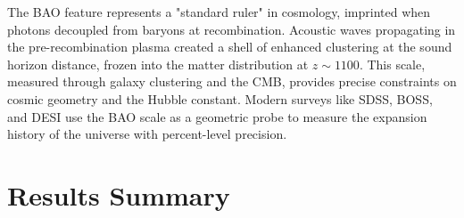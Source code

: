 \documentclass[a4paper, 11pt]{article}
\begin{document}
The BAO feature represents a "standard ruler" in cosmology, imprinted when photons decoupled
from baryons at recombination. Acoustic waves propagating in the pre-recombination plasma
created a shell of enhanced clustering at the sound horizon distance, frozen into the matter
distribution at $z \sim 1100$. This scale, measured through galaxy clustering and the CMB,
provides precise constraints on cosmic geometry and the Hubble constant. Modern surveys like
SDSS, BOSS, and DESI use the BAO scale as a geometric probe to measure the expansion history
of the universe with percent-level precision.

\section{Results Summary}
\end{document}
